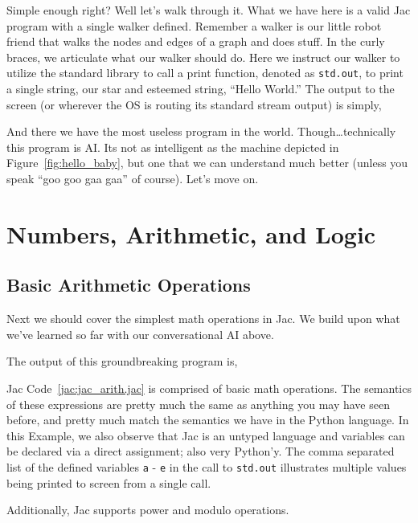 
Simple enough right? Well let's walk through it. What we have here is a valid Jac program with a single walker defined. Remember a walker is our little robot friend that walks the nodes and edges of a graph and does stuff. In the curly braces, we articulate what our walker should do. Here we instruct our walker to utilize the standard library to call a print function, denoted as \texttt{std.out}, to print a single string, our star and esteemed string, ``Hello World.'' The output to the screen (or wherever the OS is routing its standard stream output) is simply,


And there we have the most useless program in the world. Though\dots technically this program is AI. Its not as intelligent as the machine depicted in Figure~\ref{fig:hello_baby}, but one that we can understand much better (unless you speak ``\gls{goo goo gaa gaa}'' of course). Let's move on.

\section{Numbers, Arithmetic, and Logic}

\subsection{Basic Arithmetic Operations}
Next we should cover the simplest math operations in Jac. We build upon what we've learned so far with our conversational AI above.


The output of this groundbreaking program is,


Jac Code~\ref{jac:jac_arith.jac} is comprised of basic math operations. The semantics of these expressions are pretty much the same as anything you may have seen before, and pretty much match the semantics we have in the Python language. In this Example, we also observe that Jac is an untyped language and variables can be declared via a direct assignment; also very Python'y. The comma separated list of the defined variables \texttt{a} - \texttt{e} in the call to \texttt{std.out} illustrates multiple values being printed to screen from a single call.
\par
Additionally, Jac supports power and modulo operations.

